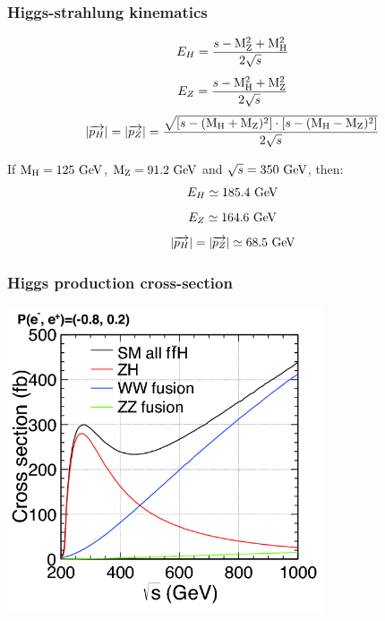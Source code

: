 \documentclass{beamer}
\begin{document}

  \begin{frame}[plain]
    \frametitle{Higgs-strahlung kinematics}

    \[ E_H = \frac{s - \rm{M}_Z^2 + \rm{M}_H^2}{2\sqrt{s}} \]
    \[ E_Z = \frac{s - \rm{M}_H^2 + \rm{M}_Z^2}{2\sqrt{s}} \]
    \[ | \overrightarrow{p_H} | = | \overrightarrow{p_Z} | = \frac{\sqrt{\left[ s - (\rm{M}_H + \rm{M}_Z)^2 \right] \cdot \left[s - (\rm{M}_H - \rm{M}_Z)^2 \right]}}{2\sqrt{s}} \]

    If $\rm{M}_H = 125~\rm{GeV}$, $\rm{M}_Z = 91.2~\rm{GeV}$ and $\sqrt{s} = 350~\rm{GeV}$, then:
    \[ E_H \simeq 185.4~\rm{GeV} \]
    \[ E_Z \simeq 164.6~\rm{GeV} \]
    \[  | \overrightarrow{p_H} | = | \overrightarrow{p_Z} | \simeq 68.5~\rm{GeV}\]

  \end{frame}


  \begin{frame}[plain,label=Xsec]
    \frametitle{Higgs production cross-section}

    \begin{center}
      \includegraphics[width = 0.7\textwidth]{Pictures/higgs_xsec_P-8_3.png}
    \end{center}
  \end{frame}

 
\end{document}
